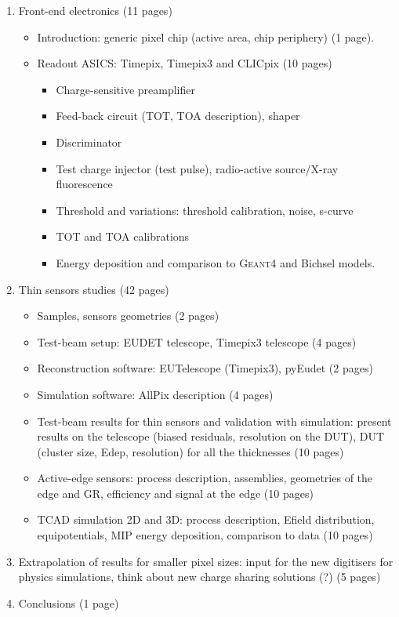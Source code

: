\begin{enumerate}
\item Front-end electronics (11 pages)
  \begin{itemize}
  \item Introduction: generic pixel chip (active area, chip periphery)
    (1 page).
  \item Readout ASICS: Timepix, Timepix3 and CLICpix (10 pages)
    \begin{itemize}
    \item Charge-sensitive preamplifier
    \item Feed-back circuit (TOT, TOA description), shaper
    \item Discriminator
    \item Test charge injector (test pulse), radio-active source/X-ray fluorescence
    \item Threshold and variations: threshold calibration, noise,
      s-curve
    \item TOT and TOA calibrations
    \item Energy deposition and comparison to \textsc{Geant4} and Bichsel models.
    \end{itemize}
  \end{itemize}

\item Thin sensors studies (42 pages)
  \begin{itemize}
  \item Samples, sensors geometries (2 pages)
  \item Test-beam setup: EUDET telescope, Timepix3 telescope (4 pages)
  \item Reconstruction software: EUTelescope (Timepix3), pyEudet (2
    pages)
  \item Simulation software: AllPix description (4 pages)
  \item Test-beam results for thin sensors and validation with
    simulation: present results on the telescope (biased residuals,
    resolution on the DUT), DUT (cluster size, Edep, resolution) for
    all the thicknesses (10 pages)
  \item Active-edge sensors: process description, assemblies,
    geometries of the edge and GR, efficiency and signal at the edge
    (10 pages)
  \item TCAD simulation 2D and 3D: process description, Efield distribution,
    equipotentials, MIP energy deposition, comparison to data (10 pages)
  \end{itemize}


\item Extrapolation of results for smaller pixel sizes: input for the
  new digitisers for physics simulations, think about new charge
  sharing solutions (?) (5 pages)

\item Conclusions (1 page)
  
\end{enumerate}

